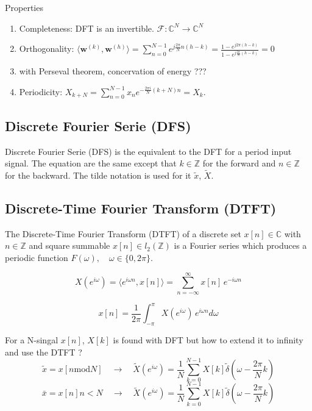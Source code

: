 \documentclass[twocolumn]{article}
\numberwithin{equation}{section}
\begin{document}
Properties
\begin{enumerate}
	\item Completeness: DFT is an invertible. $\mathcal{F}\colon\mathbb{C}^N \to \mathbb{C}^N$
	\item Orthogonality: $\langle \boldsymbol{w}^{(k)} , \boldsymbol{w}^{(h)} \rangle =\sum_{n=0}^{N-1} e^{j\frac{2 \pi}{N}n(h-k)}=\frac{1-e^{j2 \pi (h-k)}}{1-e^{j \frac{2 \pi}{N} (h-k)}}=0$
	\item with Perseval theorem, concervation of energy ???
	\item Periodicity: $X_{k+N} = \sum_{n=0}^{N-1} x_n e^{-\frac{2\pi i}{N} (k+N) n} = X_k. $
\end{enumerate} 



	\subsection{Discrete Fourier Serie (DFS)}
Discrete Fourier Serie (DFS) is the equivalent to the DFT for a period input signal. The equation are the same except that $k \in \mathbb{Z}$ for the forward and $n \in \mathbb{Z}$ for the backward. The tilde notation is used for it $\tilde{x}$, $\tilde{X}$.



	\subsection{Discrete-Time Fourier Transform (DTFT)}
\begin{framed}
The Discrete-Time Fourier Transform (DTFT) of a discrete set  $x[n] \in \mathbb{C}$ with $n \in \mathbb{Z}$ and square summable $x[n] \in l_2(\mathbb{Z})$ is a Fourier series which produces a periodic function $ F(\omega), \quad \omega \in \{0,2\pi\}$.

$$X(e^{i\omega}) = \langle e^{i\omega n},x[n] \rangle = \sum_{n=-\infty}^{\infty} x[n] \,e^{-i \omega n}$$

 $$x[n] = \frac{1}{2\pi}\int_{-\pi}^{\pi} X(e^{i\omega}) \,e^{i \omega n} d\omega$$
\end{framed}


For a N-singal $x[n]$, $X[k]$ is found with DFT but how to extend it to infinity and use the DTFT ?
$$\tilde{x}=x[n \text{mod} N] \quad \rightarrow \quad \tilde{X}(e^{i\omega})=\frac{1}{N} \sum_{k=0}^{N-1} X[k] \tilde{\delta}(\omega - \frac{2 \pi}{N}k)$$
$$\bar{x}=x[n] n<N  \quad \rightarrow \quad \tilde{X}(e^{i\omega})=\frac{1}{N} \sum_{k=0}^{N-1} X[k] \tilde{\delta}(\omega - \frac{2 \pi}{N}k)$$
\end{document}
